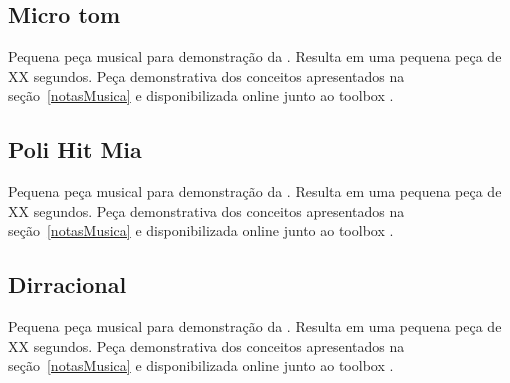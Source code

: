 \subsection{Micro tom}\label{ap:micro}
Pequena peça musical para demonstração da . Resulta em uma pequena peça de XX segundos. Peça demonstrativa dos conceitos apresentados na seção~\ref{notasMusica} e disponibilizada online junto ao toolbox \massa.



\subsection{Poli Hit Mia}\label{ap:poli}
Pequena peça musical para demonstração da . Resulta em uma pequena peça de XX segundos. Peça demonstrativa dos conceitos apresentados na seção~\ref{notasMusica} e disponibilizada online junto ao toolbox \massa.


\subsection{Dirracional}\label{ap:dirracional}
Pequena peça musical para demonstração da . Resulta em uma pequena peça de XX segundos. Peça demonstrativa dos conceitos apresentados na seção~\ref{notasMusica} e disponibilizada online junto ao toolbox \massa.


